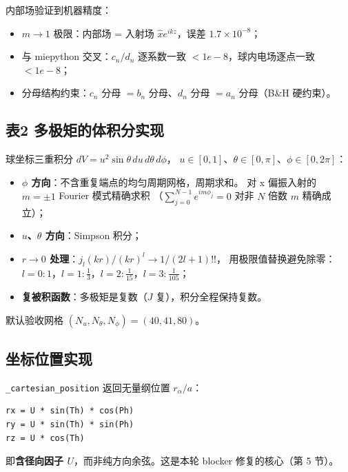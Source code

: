 内部场验证到机器精度：
\begin{itemize}
  \item $m\to1$ 极限：内部场 = 入射场 $\hat{x}e^{ikz}$，误差 $1.7\times10^{-8}$；
  \item 与 miepython 交叉：$c_n/d_n$ 逐系数一致 $<1e{-}8$，球内电场逐点一致 $<1e{-}8$；
  \item 分母结构约束：$c_n$ 分母 $=b_n$ 分母、$d_n$ 分母 $=a_n$ 分母（B\&H 硬约束）。
\end{itemize}

\subsection{表2 多极矩的体积分实现}

球坐标三重积分 $dV = u^2\sin\theta\,du\,d\theta\,d\phi$，
$u\in[0,1]$、$\theta\in[0,\pi]$、$\phi\in[0,2\pi]$：

\begin{itemize}
  \item \textbf{$\phi$ 方向}：不含重复端点的均匀周期网格，周期求和。
        对 x 偏振入射的 $m=\pm1$ Fourier 模式精确求积
        （$\sum_{j=0}^{N-1}e^{im\phi_j}=0$ 对非 $N$ 倍数 $m$ 精确成立）；
  \item \textbf{$u$、$\theta$ 方向}：Simpson 积分；
  \item \textbf{$r\to0$ 处理}：$j_l(kr)/(kr)^l \to 1/(2l+1)!!$，
        用极限值替换避免除零：
        $l=0{:}1$，$l=1{:}\tfrac13$，$l=2{:}\tfrac1{15}$，$l=3{:}\tfrac1{105}$；
  \item \textbf{复被积函数}：多极矩是复数（$J$ 复），积分全程保持复数。
\end{itemize}

默认验收网格 $(N_u,N_\theta,N_\phi)=(40,41,80)$。

\subsection{坐标位置实现}

\texttt{\_cartesian\_position} 返回无量纲位置 $r_\alpha/a$：
\begin{verbatim}
rx = U * sin(Th) * cos(Ph)
ry = U * sin(Th) * sin(Ph)
rz = U * cos(Th)
\end{verbatim}
即\textbf{含径向因子 $U$}，而非纯方向余弦。这是本轮 blocker 修复的核心（第 5 节）。
